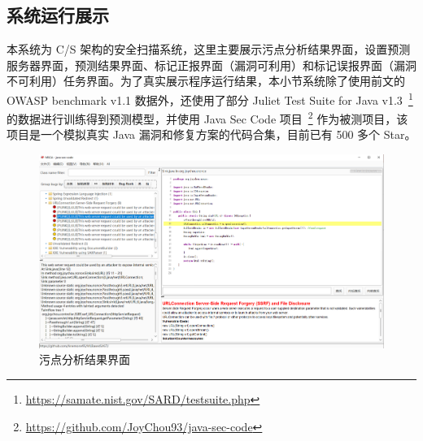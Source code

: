 %
%
%

\subsection{系统运行展示}

本系统为 C/S 架构的安全扫描系统，这里主要展示污点分析结果界面，设置预测服务器界面，预测结果界面、标记正报界面（漏洞可利用）和标记误报界面（漏洞不可利用）任务界面。为了真实展示程序运行结果，本小节系统除了使用前文的 OWASP benchmark v1.1 数据外，还使用了部分 Juliet Test Suite for Java v1.3~\footnote{\url{https://samate.nist.gov/SARD/testsuite.php}} 的数据进行训练得到预测模型，并使用 Java Sec Code 项目~\footnote{\url{https://github.com/JoyChou93/java-sec-code}} 作为被测项目，该项目是一个模拟真实 Java 漏洞和修复方案的代码合集，目前已有 500 多个 Star。

\begin{figure}[H]
    \centering
    \includegraphics[width=0.8\linewidth]{FIGs/chapter4/taintAnalysis.png}
    \caption{污点分析结果界面}\label{show:taint}
\end{figure} 

